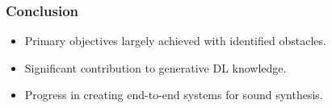 \begin{frame}
    \frametitle{Conclusion}

    \begin{itemize}
        \item Primary objectives largely achieved with identified obstacles.
        \item Significant contribution to generative DL knowledge.
        \item Progress in creating end-to-end systems for sound synthesis.
    \end{itemize}

\end{frame}


